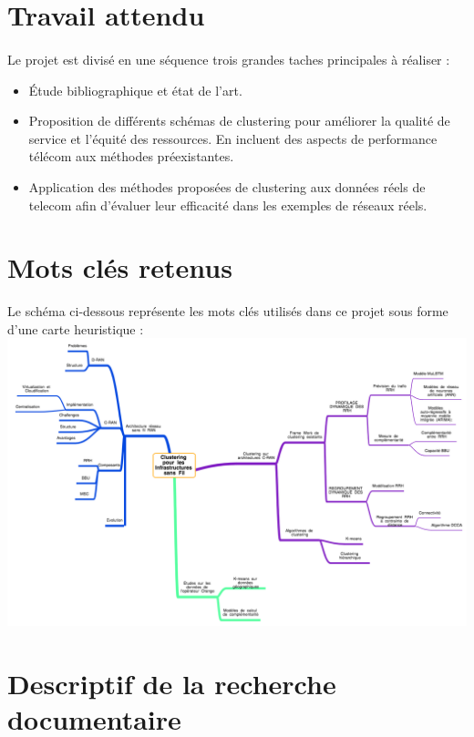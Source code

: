 \documentclass{article}
\begin{document}
\section{Travail attendu}
\paragraph{}
 Le projet est divisé en une séquence trois grandes taches principales à réaliser : \\
\begin{itemize}
    \item Étude bibliographique et état de l'art. 
    \item Proposition de différents schémas de clustering pour améliorer la qualité de service et l'équité des ressources. En incluent des aspects de performance télécom aux méthodes préexistantes.
    \item Application des méthodes proposées de clustering aux données réels de telecom afin d'évaluer leur efficacité dans les exemples de réseaux réels.
\end{itemize}

\section{Mots clés retenus}
\begin{flushleft}
Le schéma ci-dessous représente les mots clés utilisés dans ce projet sous forme d'une carte heuristique :\\
\includegraphics[width=38em]{schema.png}\\[1.5cm]
\end{flushleft}
\section{Descriptif de la recherche documentaire}
\end{document}
